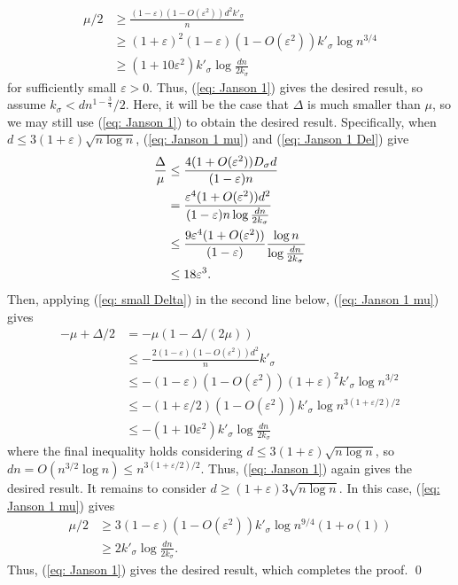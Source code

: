 \documentclass[11pt]{article}
\theoremstyle{plain}
\begin{document}
    \begin{align*}
        \mu/2 &\geq \frac{(1 - \varepsilon)(1 - O(\varepsilon^2))d^2k'_\sigma}{n}\\
        &\geq (1 + \varepsilon)^2(1 - \varepsilon)(1 - O(\varepsilon^2))k'_\sigma\log n^{3/4}\\
        &\geq (1 + 10\varepsilon^2)k'_\sigma\log\frac{dn}{2k_\sigma}
    \end{align*}
    for sufficiently small $\varepsilon > 0$. Thus, (\ref{eq: Janson 1}) gives the desired result, so assume $k_\sigma < dn^{1 - \frac{3}{4}}/2$. Here, it will be the case that $\Delta$ is much smaller than $\mu$, so we may still use (\ref{eq: Janson 1}) to obtain the desired result. Specifically, when $d\leq 3(1 + \varepsilon)\sqrt {n\log n}$, (\ref{eq: Janson 1 mu}) and (\ref{eq: Janson 1 Del}) give 
    \begin{align}
        \frac{\Delta}{\mu} &\leq \frac{4(1 + O(\varepsilon^2))D_{\sigma}d}{(1 - \varepsilon)n}\notag\\
        &= \frac{\varepsilon^4(1 + O(\varepsilon^2))d^2}{(1 - \varepsilon)n\log\frac{dn}{2k_\sigma}}\notag\\
        &\leq \frac{9\varepsilon^4(1 + O(\varepsilon^2))}{(1 - \varepsilon)}\frac{\log n}{\log\frac{dn}{2k_\sigma}}\notag\\
        &\leq 18\varepsilon^3. \label{eq: small Delta}
    \end{align}
    Then, applying (\ref{eq: small Delta}) in the second line below, (\ref{eq: Janson 1 mu}) gives
    \begin{align*}
        -\mu + \Delta/2 &= -\mu(1 - \Delta/(2\mu))\\
        &\leq -\frac{2(1 - \varepsilon)(1 - O(\varepsilon^2))d^2}{n}k'_\sigma\\
        &\leq -(1 - \varepsilon)(1 - O(\varepsilon^2))(1 + \varepsilon)^2k'_\sigma\log n^{3/2} \\
        &\leq -(1 + \varepsilon/2)(1 - O(\varepsilon^2))k'_\sigma\log n^{3(1 + \varepsilon/2)/2}  \\
        &\leq -(1 + 10\varepsilon^2)k'_\sigma\log\frac{dn}{2k_\sigma}
    \end{align*}
    where the final inequality holds considering $d \leq 3(1 + \varepsilon)\sqrt{n\log n}$, so $dn = O(n^{3/2}\log n) \leq n^{3(1 + \varepsilon/2)/2}$. Thus, (\ref{eq: Janson 1}) again gives the desired result. It remains to consider $d \geq (1 + \varepsilon)3\sqrt{n \log n}$. In this case, (\ref{eq: Janson 1 mu}) gives 
    \begin{align*}
        \mu/2 &\geq 3(1 - \varepsilon)(1 - O(\varepsilon^2))k'_\sigma\log n^{9/4}(1 + o(1))\\
        &\geq 2k'_\sigma\log\frac{dn}{2k_\sigma}.
    \end{align*}
    Thus, (\ref{eq: Janson 1}) gives the desired result, which completes the proof.
\qed
\end{document}
